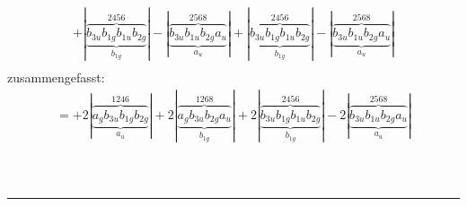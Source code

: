 \documentclass{article}
\begin{document}
\begin{multline*}
+\left|\underbrace{\overbrace{b_{3u} b_{1g} b_{1u} b_{2g}}^{2 4 5 6}}_{b_{1g}}\right|-\left|\underbrace{\overbrace{b_{3u} b_{1u} b_{2g} a_{u}}^{2 5 6 8}}_{a_{u}}\right|+\left|\underbrace{\overbrace{b_{3u} b_{1g} b_{1u} b_{2g}}^{2 4 5 6}}_{b_{1g}}\right|-\left|\underbrace{\overbrace{b_{3u} b_{1u} b_{2g} a_{u}}^{2 5 6 8}}_{a_{u}}\right|\\
\end{multline*}zusammengefasst:\begin{multline*}
=+2\left|\underbrace{\overbrace{a_{g} b_{3u} b_{1g} b_{2g}}^{1 2 4 6}}_{a_{u}}\right|+2\left|\underbrace{\overbrace{a_{g} b_{3u} b_{2g} a_{u}}^{1 2 6 8}}_{b_{1g}}\right|+2\left|\underbrace{\overbrace{b_{3u} b_{1g} b_{1u} b_{2g}}^{2 4 5 6}}_{b_{1g}}\right|-2\left|\underbrace{\overbrace{b_{3u} b_{1u} b_{2g} a_{u}}^{2 5 6 8}}_{a_{u}}\right|\\
\end{multline*}\\ \\
\hrule\newpage 
\end{document}
